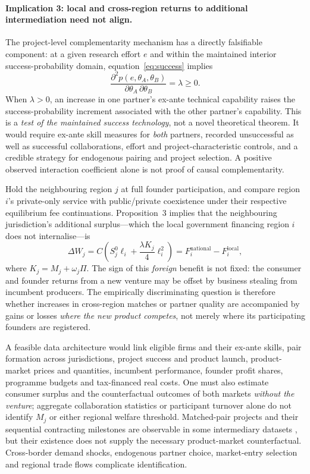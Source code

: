 \documentclass[11pt]{article}
\begin{document}
\paragraph{Implication 3: local and cross-region returns to additional intermediation need not align.}
The project-level complementarity mechanism has a directly falsifiable component: at a given research effort $e$ and within the maintained interior success-probability domain, equation~\eqref{eq:success} implies
\begin{equation}
 \frac{\partial^2 p(e,\theta_A,\theta_B)}
 {\partial\theta_A\,\partial\theta_B}=\lambda\geq0.
 \label{eq:empirical-skill-complementarity}
\end{equation}
When $\lambda>0$, an increase in one partner's ex-ante technical capability raises the success-probability increment associated with the other partner's capability. This is a \emph{test of the maintained success technology}, not a novel theoretical theorem. It would require ex-ante skill measures for \emph{both} partners, recorded unsuccessful as well as successful collaborations, effort and project-characteristic controls, and a credible strategy for endogenous pairing and project selection. A positive observed interaction coefficient alone is not proof of causal complementarity.


Hold the neighbouring region $j$ at full founder participation, and compare region $i$'s private-only service with public/private coexistence under their respective equilibrium fee continuations. Proposition~3 implies that the neighbouring jurisdiction's additional surplus---which the local government financing region $i$ does not internalise---is
\begin{equation}
 \Delta W_j=
 C\left(S_j^0\ell_i+\frac{\lambda K_j}{4}\ell_i^2\right)
 =F_i^{\mathrm{national}}-F_i^{\mathrm{local}},
 \label{eq:empirical-spillover}
\end{equation}
where $K_j=M_j+\omega_j\Pi$. The sign of this \emph{foreign} benefit is not fixed: the consumer and founder returns from a new venture may be offset by business stealing from incumbent producers. The empirically discriminating question is therefore whether increases in cross-region matches or partner quality are accompanied by gains or losses \emph{where the new product competes}, not merely where its participating founders are registered.

A feasible data architecture would link eligible firms and their ex-ante skills, pair formation across jurisdictions, project success and product launch, product-market prices and quantities, incumbent performance, founder profit shares, programme budgets and tax-financed real costs. One must also estimate consumer surplus and the counterfactual outcomes of both markets \emph{without the venture}; aggregate collaboration statistics or participant turnover alone do not identify $M_j$ or either regional welfare threshold. Matched-pair projects and their sequential contracting milestones are observable in some intermediary datasets \citep{EldeboHjelm2025}, but their existence does not supply the necessary product-market counterfactual. Cross-border demand shocks, endogenous partner choice, market-entry selection and regional trade flows complicate identification.
\end{document}
